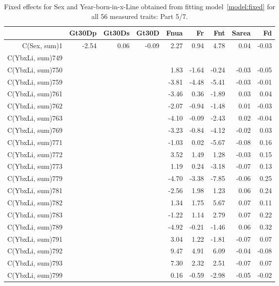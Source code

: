 \begin{table}[p]
\centering
\caption{Fixed effects for Sex and Year-born-in-x-Line obtained from fitting model~\ref{model:fixed} for all 56 measured traits: Part 5/7.}
\label{tab:b5}
\begin{tabular}{rrrrrrrrr}
  \hline
 & Gt30Dp & Gt30Ds & Gt30D & Fnua & Fr & Fnt & Sarea & Fd \\ 
  \hline
C(Sex, sum)1 & -2.54 & 0.06 & -0.09 & 2.27 & 0.94 & 4.78 & 0.04 & -0.03 \\ 
  C(YbxLi, sum)749 &  &  &  &  &  &  &  &  \\ 
  C(YbxLi, sum)750 &  &  &  & 1.83 & -1.64 & -0.24 & -0.03 & -0.05 \\ 
  C(YbxLi, sum)759 &  &  &  & -3.81 & -4.48 & -5.41 & -0.03 & -0.01 \\ 
  C(YbxLi, sum)761 &  &  &  & -3.46 & 0.36 & -1.89 & 0.03 & 0.04 \\ 
  C(YbxLi, sum)762 &  &  &  & -2.07 & -0.94 & -1.48 & 0.01 & -0.03 \\ 
  C(YbxLi, sum)763 &  &  &  & -4.10 & -0.09 & -2.43 & 0.02 & -0.04 \\ 
  C(YbxLi, sum)769 &  &  &  & -3.23 & -0.84 & -4.12 & -0.02 & 0.03 \\ 
  C(YbxLi, sum)771 &  &  &  & -1.03 & 0.02 & -5.67 & -0.08 & 0.16 \\ 
  C(YbxLi, sum)772 &  &  &  & 3.52 & 1.49 & 1.28 & -0.03 & 0.15 \\ 
  C(YbxLi, sum)773 &  &  &  & 1.19 & 0.24 & -3.18 & -0.07 & 0.13 \\ 
  C(YbxLi, sum)779 &  &  &  & -4.70 & -3.38 & -7.85 & -0.06 & 0.25 \\ 
  C(YbxLi, sum)781 &  &  &  & -2.56 & 1.98 & 1.23 & 0.06 & 0.24 \\ 
  C(YbxLi, sum)782 &  &  &  & 1.34 & 1.75 & 5.67 & 0.07 & 0.11 \\ 
  C(YbxLi, sum)783 &  &  &  & -1.22 & 1.14 & 2.79 & 0.07 & 0.22 \\ 
  C(YbxLi, sum)789 &  &  &  & -4.92 & -0.21 & -1.46 & 0.06 & 0.32 \\ 
  C(YbxLi, sum)791 &  &  &  & 3.04 & 1.22 & -1.81 & -0.07 & 0.07 \\ 
  C(YbxLi, sum)792 &  &  &  & 9.47 & 4.91 & 6.09 & -0.04 & -0.08 \\ 
  C(YbxLi, sum)793 &  &  &  & 7.30 & 2.32 & 2.51 & -0.07 & 0.07 \\ 
  C(YbxLi, sum)799 &  &  &  & 0.16 & -0.59 & -2.98 & -0.05 & -0.02 \\ 

\end{tabular}
\end{table}
